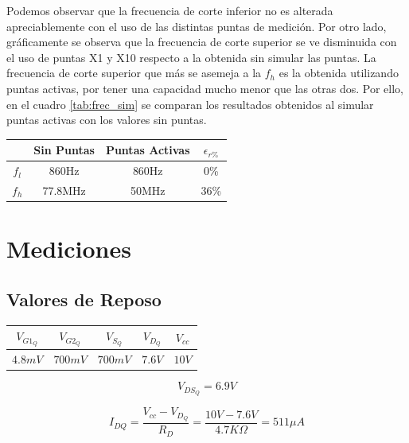 \documentclass[a4paper, 10pt, spanish]{article}
\begin{document}
Podemos observar que la frecuencia de corte inferior no es alterada apreciablemente con el uso de las distintas puntas de medición. Por otro lado, gráficamente se observa que la frecuencia de corte superior se ve disminuida con el uso de puntas X1 y X10 respecto a la obtenida sin simular las puntas. La frecuencia de corte superior que más se asemeja a la $f_h$ es la obtenida utilizando puntas activas, por tener una capacidad mucho menor que las otras dos. Por ello, en el cuadro \ref{tab:frec_sim} se comparan los resultados obtenidos al simular puntas activas con los valores sin puntas.

\begin{center}
  \begin{tabular}{|c|c|c|c|}
    \hline
     & Sin Puntas & Puntas Activas & $\epsilon_{r\%}$ \\
    \hline
    $f_l$ & 860Hz & 860Hz & 0\% \\
    \hline
    $f_h$ & 77.8MHz & 50MHz & 36\% \\
    \hline
  \end{tabular}
\end{center}

\section{Mediciones}

\subsection{Valores de Reposo}

\begin{center}
  \begin{tabular}{|c|c|c|c|c|}
    \hline
    $V_{G1_Q}$ & $V_{G2_Q}$ & $V_{S_Q}$ & $V_{D_Q}$ & $V_{cc}$ \\
    \hline
    $4.8mV$ & $700mV$ & $700mV$ & $7.6V$ & $10V$ \\
    \hline
  \end{tabular}
  \label{tab:valores_reposo_med}
\end{center}

\begin{equation}
  V_{DS_Q} = 6.9V
\end{equation}

\begin{equation}
  I_{DQ} = \frac{V_{cc} - V_{D_Q}}{R_D} = \frac{10V - 7.6V}{4.7K\Omega} = 511 \mu A
\end{equation}
\end{document}
